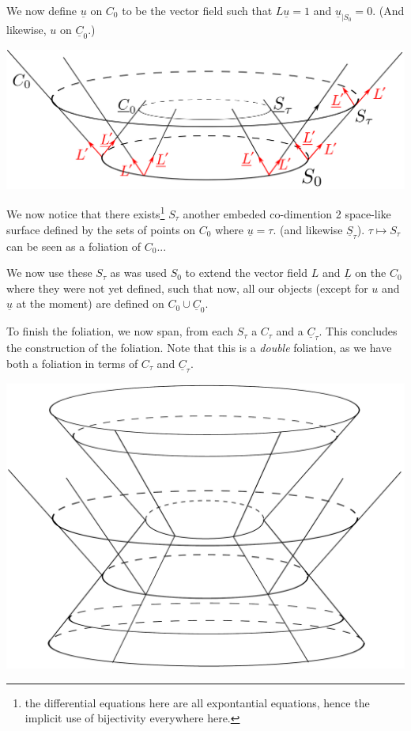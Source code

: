 \documentclass[a4paper,11pt]{article}
\numberwithin{equation}{section}
\theoremstyle{definition}
\newtheorem{comment}{Comment}
\begin{document}
We now define $\underline{u}$ on $C_0$ to be the vector field such that $L \underline{u}=1$ and $\underline{u}_{|S_0}=0$. (And likewise, $u$ on $\underline{C}_0$.)
\begin{center}
    \includegraphics [width=0.75\linewidth] {Pictures/02_VFields.png}
\end{center}

We now notice that there exists\footnote{the differential equations here are all expontantial equations, hence the implicit use of bijectivity everywhere here.} $S_\tau$ another embeded co-dimention 2 space-like surface defined by the sets of points on $C_0$ where $\underline{u}=\tau$. (and likewise $\underline{S}_\tau$). $\tau\mapsto S_\tau$ can be seen as a foliation of $C_0$...

We now use these $S_\tau$ as was used $S_0$ to extend the vector field $L$ and $\underline{L}$ on the $C_0$ where they were not yet defined, such that now, all our objects (except for $u$ and $\underline{u}$ at the moment) are defined on $C_0\cup\underline{C}_0$.

To finish the foliation, we now span, from each $S_\tau$ a $C_\tau$ and a $\underline{C}_\tau$. This concludes the construction of the foliation. Note that this is a \emph{double} foliation, as we have both a foliation in terms of $C_\tau$ and $\underline{C}_\tau$.
\begin{center}
    \includegraphics [width=0.75\linewidth] {Pictures/03_Foliation.png}
\end{center}
\end{document}
